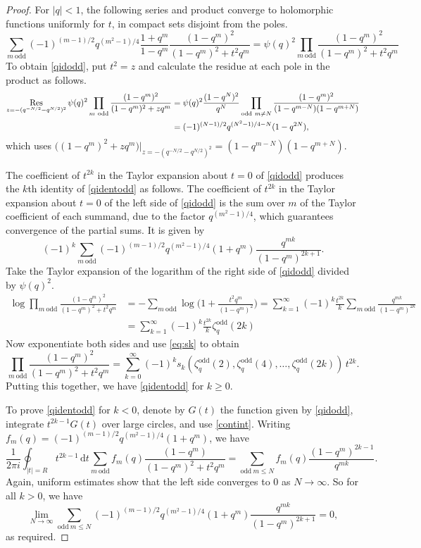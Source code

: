\documentclass[a4paper]{article}
\theoremstyle{plain}
\theoremstyle{definition}
\newcommand{\dd}{\mathrm{d}}
\renewcommand{\leq}{\leqslant}
\renewcommand{\geq}{\geqslant}
\newcommand{\Res}{\mathop{\,\rm Res\,}}
\begin{document}
\begin{proof}
For $|q|<1$, the following series and product converge to holomorphic functions uniformly for $t$, in compact sets disjoint from the poles.
\begin{equation} \label{qidodd}
\sum_{m~\mathrm{odd}}(-1)^{(m-1)/2} q^{(m^2-1)/4} \frac{1+q^m}{1-q^m} \frac{(1-q^m)^2}{(1-q^m)^2+t^2q^m}=\psi(q)^2\prod_{m~\mathrm{odd}}\frac{(1-q^m)^2}{(1-q^m)^2+t^2q^m}
\end{equation}
To obtain \cref{qidodd}, put $t^2=z$ and calculate the residue at each pole in the product as follows.
\begin{align*} 
\Res_{z=-(q^{-N/2}-q^{N/2})^2}\psi(q)^2\prod_{m~\mathrm{odd}}\frac{(1-q^m)^2}{(1-q^m)^2+zq^m}&=\psi(q)^2\frac{(1-q^N)^2}{q^N} \prod_{\mathrm{odd}~m\neq N} \frac{(1-q^m)^2}{(1-q^{m-N})(1-q^{m+N})}\\
&=(-1)^{(N-1)/2} q^{(N^2-1)/4-N}(1-q^{2N}),
\end{align*} 
which uses $\big((1-q^m)^2+zq^m\big)|_{z=-(q^{-N/2}-q^{N/2})^2}=(1-q^{m-N})(1-q^{m+N})$.


The coefficient of $t^{2k}$ in the Taylor expansion about $t=0$ of \cref{qidodd} produces the $k$th identity of \cref{qidentodd} as follows. The coefficient of $t^{2k}$ in the Taylor expansion about $t=0$ of the left side of \cref{qidodd} is the sum over $m$ of the Taylor coefficient of each summand, due to the factor $q^{(m^2-1)/4}$, which guarantees convergence of the partial sums. It is given by
\[
(-1)^k\sum_{m~\mathrm{odd}}(-1)^{(m-1)/2} q^{(m^2-1)/4} (1+q^m)\frac{q^{mk}}{(1-q^m)^{2k+1}}.
\] 
Take the Taylor expansion of the logarithm of the right side of \cref{qidodd} divided by $\psi(q)^2$.
\begin{align*}
\log\prod_{m~\mathrm{odd}}\frac{(1-q^m)^2}{(1-q^m)^2+t^2q^m} &= -\sum_{m~\mathrm{odd}}\log\Big(1+\frac{t^2q^m}{(1-q^m)^2}\Big)=\sum_{k=1}^\infty (-1)^k\frac{t^{2k}}{k}\sum_{m~\mathrm{odd}} \frac{q^{mk}}{(1-q^m)^{2k}}\\
&=\sum_{k=1}^\infty (-1)^k\frac{t^{2k}}{k}\zeta^{\mathrm{odd}}_q(2k)
\end{align*}
Now exponentiate both sides and use \cref{eq:sk} to obtain
\[
\prod_{m~\mathrm{odd}}\frac{(1-q^m)^2}{(1-q^m)^2+t^2q^m}=\sum_{k=0}^\infty (-1)^k s_k(\zeta^{\mathrm{odd}}_q(2), \zeta^{\mathrm{odd}}_q(4), \ldots, \zeta^{\mathrm{odd}}_q(2k)) \, t^{2k}.
\]
Putting this together, we have \cref{qidentodd} for $k \geq 0$.


To prove \cref{qidentodd} for $k < 0$, denote by $G(t)$ the function given by \cref{qidodd}, integrate $t^{2k-1}G(t)$ over large circles, and use \cref{contint}. Writing $f_m(q) = (-1)^{(m-1)/2} q^{(m^2-1)/4} (1+q^m)$, we have
\[
\frac{1}{2\pi i} \oint_{|t|=R} t^{2k-1} \, \dd t\sum_{m~\mathrm{odd}}f_m(q)\frac{(1-q^m)}{(1-q^m)^2+t^2q^m} = \sum_{\mathrm{odd}~m\leq N}f_m(q)\frac{(1-q^m)^{2k-1}}{q^{mk}}.
\]
Again, uniform estimates show that the left side converges to 0 as $N \to \infty$. So for all $k>0$, we have
\[
\lim_{N \to \infty} \sum_{\mathrm{odd}~m\leq N}(-1)^{(m-1)/2} q^{(m^2-1)/4} (1+q^m)\frac{q^{mk}}{(1-q^m)^{2k+1}}=0,
\]
as required.
\end{proof}
\end{document}
